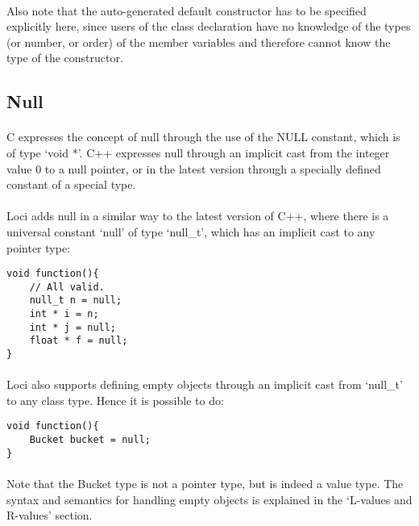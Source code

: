 \documentclass[12pt,twoside,notitlepage]{report}
\begin{document}
\paragraph{}
Also note that the auto-generated default constructor has to be specified explicitly here, since users of the class declaration have no knowledge of the types (or number, or order) of the member variables and therefore cannot know the type of the constructor.

\subsection{Null}

\paragraph{}
C expresses the concept of null through the use of the NULL constant, which is of type `void *'. C++ expresses null through an implicit cast from the integer value 0 to a null pointer, or in the latest version through a specially defined constant of a special type.

\paragraph{}
Loci adds null in a similar way to the latest version of C++, where there is a universal constant `null' of type `null\_t', which has an implicit cast to any pointer type:

\small{
\begin{verbatim}
void function(){
    // All valid.
    null_t n = null;
    int * i = n;
    int * j = null;
    float * f = null;
}
\end{verbatim}
}

\paragraph{}
Loci also supports defining empty objects through an implicit cast from `null\_t' to any class type. Hence it is possible to do:

\small{
\begin{verbatim}
void function(){
    Bucket bucket = null;
}
\end{verbatim}
}

\paragraph{}
Note that the Bucket type is not a pointer type, but is indeed a value type. The syntax and semantics for handling empty objects is explained in the `L-values and R-values' section.
\end{document}
